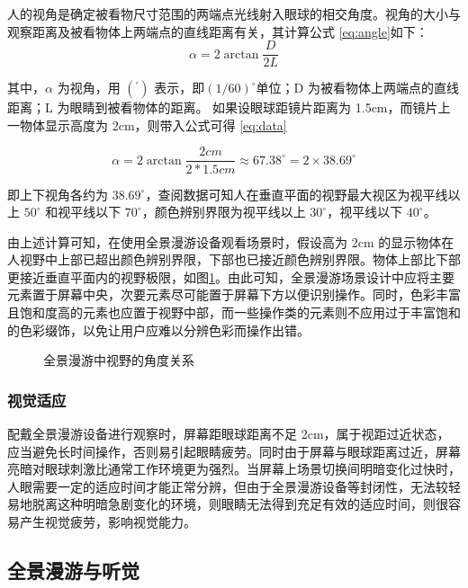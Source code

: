 人的视角是确定被看物尺寸范围的两端点光线射入眼球的相交角度。视角的大小与观察距离及被看物体上两端点的直线距离有关，其计算公式 \ref{eq:angle}如下：
\begin{equation}
\alpha=2\arctan{\frac{D}{2L}}
\label{eq:angle}
\end{equation}

其中，$\alpha$ 为视角，用 $(^{\prime})$ 表示，即$(1/60)^{\circ}$单位；D 为被看物体上两端点的直线距离；L 为眼睛到被看物体的距离。
如果设眼球距镜片距离为 1.5cm，而镜片上一物体显示高度为 2cm，则带入公式可得 \ref{eq:data}

\begin{equation}
\alpha=2\arctan{\frac{2cm}{2*1.5cm}}\approx 67.38 ^{\circ} = 2 \times 38.69^{\circ}
\label{eq:data}
\end{equation}

即上下视角各约为 $38.69^{\circ}$，查阅数据可知人在垂直平面的视野最大视区为视平线以上 $50^{\circ}$ 和视平线以下 $70^{\circ}$，颜色辨别界限为视平线以上 $30^{\circ}$，视平线以下 $40^{\circ}$。

由上述计算可知，在使用全景漫游设备观看场景时，假设高为 2cm 的显示物体在人视野中上部已超出颜色辨别界限，下部也已接近颜色辨别界限。物体上部比下部更接近垂直平面内的视野极限，如图\ref{fig:angle}。由此可知，全景漫游场景设计中应将主要元素置于屏幕中央，次要元素尽可能置于屏幕下方以便识别操作。同时，色彩丰富且饱和度高的元素也应置于视野中部，而一些操作类的元素则不应用过于丰富饱和的色彩缀饰，以免让用户应难以分辨色彩而操作出错。

\begin{figure}[htp]
\centering
{}
\caption{全景漫游中视野的角度关系}
\label{fig:angle}
\end{figure}

\subsubsection{视觉适应}

配戴全景漫游设备进行观察时，屏幕距眼球距离不足 2cm，属于视距过近状态，应当避免长时间操作，否则易引起眼睛疲劳。同时由于屏幕与眼球距离过近，屏幕亮暗对眼球刺激比通常工作环境更为强烈。当屏幕上场景切换间明暗变化过快时，人眼需要一定的适应时间才能正常分辨，但由于全景漫游设备等封闭性，无法较轻易地脱离这种明暗急剧变化的环境，则眼睛无法得到充足有效的适应时间，则很容易产生视觉疲劳，影响视觉能力。

\subsection{全景漫游与听觉}

